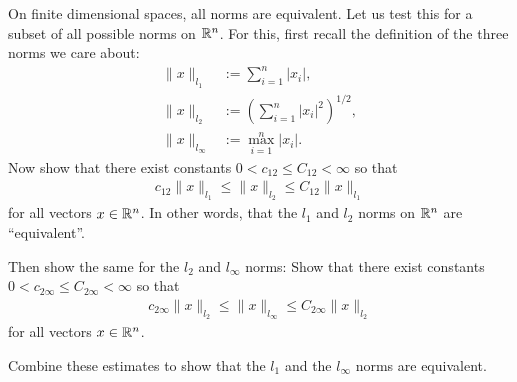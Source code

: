 \documentclass[12pt]{memoir}
\begin{document}
\begin{Ej}
    On finite dimensional spaces, all norms are equivalent. Let us test
    this for a subset of all possible norms on $\mathbb{R}^n$. For this, first
    recall the definition of the three norms we care about:
    \begin{align*}
      \| x \|_{l_1} &:= \sum_{i=1}^n |x_i|, \\
      \| x \|_{l_2} &:= \left(\sum_{i=1}^n |x_i|^2 \right)^{1/2}, \\
      \| x \|_{l_\infty} &:= \max_{i=1}^n |x_i|.
    \end{align*}
    Now show that there
    exist constants $0<c_{12}\le C_{12} <\infty$ so that
    \begin{align*}
      c_{12} \| x \|_{l_1} \le \| x \|_{l_2} \le C_{12} \| x \|_{l_1}
    \end{align*}
    for all vectors $x\in \mathbb{R}^n$. In other words, that the $l_1$ and $l_2$
    norms on $\mathbb{R}^n$ are ``equivalent''.
    
    Then show the same for the $l_2$ and $l_\infty$ norms: Show that there
    exist constants $0<c_{2\infty}\le C_{2\infty} <\infty$ so that
    \begin{align*}
      c_{2\infty} \| x \|_{l_2} \le \| x \|_{l_\infty} \le C_{2\infty} \| x \|_{l_2}
    \end{align*}
    for all vectors $x\in \mathbb{R}^n$.
    
    Combine these estimates to show that the $l_1$ and the $l_\infty$
    norms are equivalent.
\end{Ej}
\end{document}
